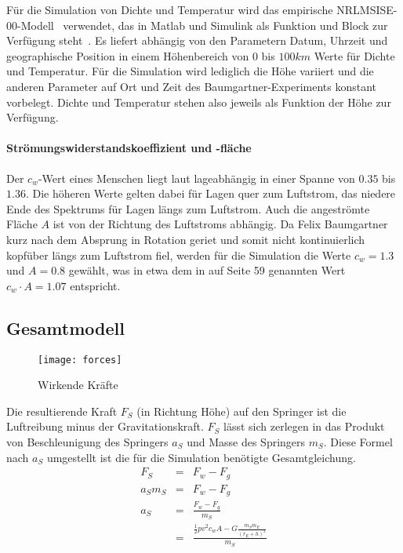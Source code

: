 Für die Simulation von Dichte und Temperatur wird das empirische NRLMSISE-00-Modell~\cite{nrlmsise00:goddardspaceflightcenter} verwendet, das in Matlab und Simulink als Funktion und Block zur Verfügung steht~\cite{matlab:mrlmsise-00}.
Es liefert abhängig von den Parametern Datum, Uhrzeit und geographische Position in einem Höhenbereich von $0$ bis $100km$ Werte für Dichte und Temperatur.
Für die Simulation wird lediglich die Höhe variiert und die anderen Parameter auf Ort und Zeit des Baumgartner-Experiments konstant vorbelegt.
Dichte und Temperatur stehen also jeweils als Funktion der Höhe zur Verfügung.

\paragraph{Strömungswiderstandskoeffizient und -fläche}
Der $c_w$-Wert eines Menschen liegt laut \cite[88]{humankinetics} lageabhängig in einer Spanne von $0.35$ bis $1.36$.
Die höheren Werte gelten dabei für Lagen quer zum Luftstrom, das niedere Ende des Spektrums für Lagen längs zum Luftstrom.
Auch die angeströmte Fläche $A$ ist von der Richtung des Luftstroms abhängig.
Da Felix Baumgartner kurz nach dem Absprung in Rotation geriet und somit nicht kontinuierlich kopfüber längs zum Luftstrom fiel, werden für die Simulation die Werte $c_w=1.3$ und $A=0.8$ gewählt, was in etwa dem in \cite{redbulletin:stratosspecialde} auf Seite 59 genannten Wert $c_w\cdot A=1.07$ entspricht.

\subsection{Gesamtmodell}

\begin{figure}[h]
  \centering
  \texttt{[image: forces]}
  \caption{Wirkende Kräfte}
  \label{fig:forces}
\end{figure}
Die resultierende Kraft $F_S$ (in Richtung Höhe) auf den Springer ist die Luftreibung minus der Gravitationskraft.
$F_S$ lässt sich zerlegen in das Produkt von Beschleunigung des Springers $a_S$ und Masse des Springers $m_S$.
Diese Formel nach $a_S$ umgestellt ist die für die Simulation benötigte Gesamtgleichung.
\begin{eqnarray}
  F_S &=& F_w-F_g \\
  a_Sm_S &=& F_w-F_g \nonumber \\
  a_S &=& \frac{F_w-F_g}{m_S}\\
   &=& \frac{\frac{1}{2}pv^2c_wA-G\frac{m_Sm_E}{(r_E+h)^2}}{m_S} \nonumber
\end{eqnarray}




